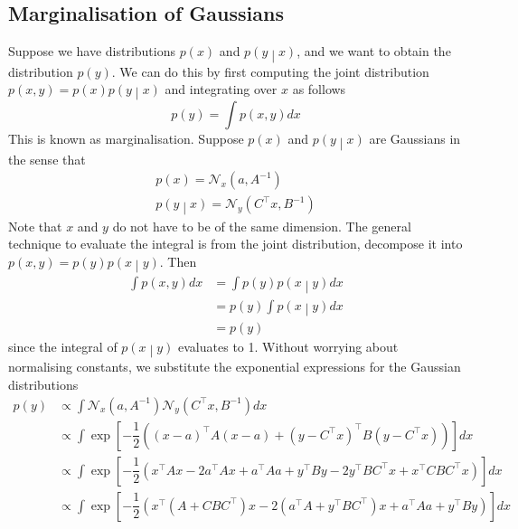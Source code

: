 \documentclass[11pt]{report} %
\begin{document}
\subsection{Marginalisation of Gaussians}

Suppose we have distributions $p\left(x\right)$ and $p\left(y\middle|x\right)$, and we want to obtain the distribution $p\left(y\right)$. We can do this by first computing the joint distribution $p\left(x, y\right) = p\left(x\right)p\left(y\middle|x\right)$ and integrating over $x$ as follows
\begin{equation}
p\left(y\right) = \int p\left(x, y\right)dx
\end{equation}
This is known as marginalisation. Suppose $p\left(x\right)$ and $p\left(y\middle|x\right)$ are Gaussians in the sense that
\begin{gather}
p\left(x\right) = \mathcal{N}_{x}\left(a, A^{-1}\right) \\
p\left(y\middle|x\right) = \mathcal{N}_{y}\left(C^{\top}x, B^{-1}\right)
\end{gather}
Note that $x$ and $y$ do not have to be of the same dimension. The general technique to evaluate the integral is from the joint distribution, decompose it into $p\left(x, y\right) = p\left(y\right)p\left(x\middle|y\right)$. Then
\begin{align}
\int p\left(x, y\right)dx &= \int p\left(y\right)p\left(x\middle|y\right)dx
\\
&= p\left(y\right) \int p\left(x\middle|y\right)dx \\
&= p\left(y\right)
\end{align}
since the integral of $p\left(x\middle|y\right)$ evaluates to 1. Without worrying about normalising constants, we substitute the exponential expressions for the Gaussian distributions
\begin{align}
p\left(y\right) &\propto \int\mathcal{N}_{x}\left(a,A^{-1}\right)\mathcal{N}_{y}\left(C^{\top}x,B^{-1}\right)dx \\
&\propto \int\exp\left[-\dfrac{1}{2}\left(\left(x-a\right)^{\top}A\left(x-a\right)+\left(y-C^{\top}x\right)^{\top}B\left(y-C^{\top}x\right)\right)\right]dx \\
&\propto \int\exp\left[-\dfrac{1}{2}\left(x^{\top}Ax-2a^{\top}Ax+a^{\top}Aa+y^{\top}By-2y^{\top}BC^{\top}x+x^{\top}CBC^{\top}x\right)\right]dx \\
&\propto \int\exp\left[-\dfrac{1}{2}\left(x^{\top}\left(A+CBC^{\top}\right)x-2\left(a^{\top}A+y^{\top}BC^{\top}\right)x+a^{\top}Aa+y^{\top}By\right)\right]dx
\end{align}
\end{document}
